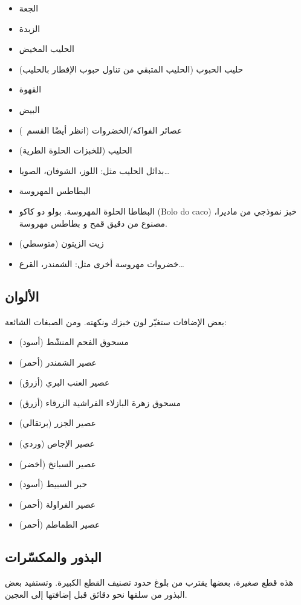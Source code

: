 \begin{itemize}
\item الجعة
\item الزبدة
\item الحليب المخيض
\item حليب الحبوب (الحليب المتبقي من تناول حبوب الإفطار بالحليب)
\item القهوة
\item البيض
\item عصائر الفواكه/الخضروات (انظر أيضًا القسم~\LR{\ref{sec:colors}})
\item الحليب (للخبزات الحلوة الطرية)
\item بدائل الحليب مثل: اللوز، الشوفان، الصويا…
\item البطاطس المهروسة
\item البطاطا الحلوة المهروسة. بولو دو كاكو \textenglish{(Bolo do caco)} خبز نموذجي من ماديرا، مصنوع من  دقيق قمح و بطاطس مهروسة.
\item زيت الزيتون (متوسطي)
\item خضروات مهروسة أخرى مثل: الشمندر، القرع…
\end{itemize}

\subsection{الألوان}%
\label{sec:colors}
بعض الإضافات ستغيّر لون خبزك ونكهته. ومن الصبغات الشائعة:

\begin{itemize}
\item مسحوق الفحم المنشّط (أسود)
\item عصير الشمندر (أحمر)
\item عصير العنب البري (أزرق)
\item مسحوق زهرة البازلاء الفراشية الزرقاء (أزرق)
\item عصير الجزر (برتقالي)
\item عصير الإجاص (وردي)
\item عصير السبانخ (أخضر)
\item حبر السبيط (أسود)
\item عصير الفراولة (أحمر)
\item عصير الطماطم (أحمر)
\end{itemize}

\subsection{البذور والمكسّرات}
هذه قطع صغيرة، بعضها يقترب من بلوغ حدود تصنيف القطع الكبيرة. وتستفيد بعض البذور من سلقها نحو  دقائق قبل إضافتها إلى العجين.

